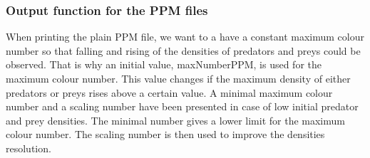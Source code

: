 \subsubsection{Output function for the PPM files}
When printing the plain PPM file, we want to a have a constant maximum colour number so that falling and rising of the densities of predators and preys could be observed. That is why an initial value, maxNumberPPM, is used for the maximum colour number. This value changes if the maximum density of either predators or preys rises above a certain value.
A minimal maximum colour number and a scaling number have been presented in case of low initial predator and prey densities. The minimal number gives a lower limit for the maximum colour number. The scaling number is then used to improve the densities resolution.  



